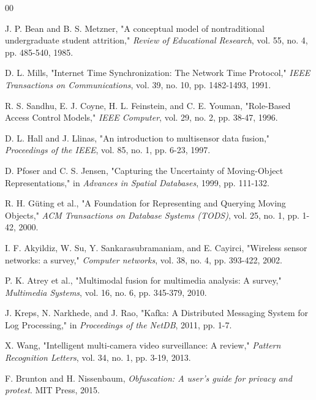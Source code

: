 \documentclass[conference]{IEEEtran}
\begin{document}
\begin{thebibliography}{00}

 J. P. Bean and B. S. Metzner, "A conceptual model of nontraditional undergraduate student attrition," \textit{Review of Educational Research}, vol. 55, no. 4, pp. 485-540, 1985.

 D. L. Mills, "Internet Time Synchronization: The Network Time Protocol," \textit{IEEE Transactions on Communications}, vol. 39, no. 10, pp. 1482-1493, 1991.

 R. S. Sandhu, E. J. Coyne, H. L. Feinstein, and C. E. Youman, "Role-Based Access Control Models," \textit{IEEE Computer}, vol. 29, no. 2, pp. 38-47, 1996.


 D. L. Hall and J. Llinas, "An introduction to multisensor data fusion," \textit{Proceedings of the IEEE}, vol. 85, no. 1, pp. 6-23, 1997.

 D. Pfoser and C. S. Jensen, "Capturing the Uncertainty of Moving-Object Representations," in \textit{Advances in Spatial Databases}, 1999, pp. 111-132.


 R. H. Güting et al., "A Foundation for Representing and Querying Moving Objects," \textit{ACM Transactions on Database Systems (TODS)}, vol. 25, no. 1, pp. 1-42, 2000.

 I. F. Akyildiz, W. Su, Y. Sankarasubramaniam, and E. Cayirci, "Wireless sensor networks: a survey," \textit{Computer networks}, vol. 38, no. 4, pp. 393-422, 2002.

 P. K. Atrey et al., "Multimodal fusion for multimedia analysis: A survey," \textit{Multimedia Systems}, vol. 16, no. 6, pp. 345-379, 2010.

 J. Kreps, N. Narkhede, and J. Rao, "Kafka: A Distributed Messaging System for Log Processing," in \textit{Proceedings of the NetDB}, 2011, pp. 1-7.


 X. Wang, "Intelligent multi-camera video surveillance: A review," \textit{Pattern Recognition Letters}, vol. 34, no. 1, pp. 3-19, 2013.

 F. Brunton and H. Nissenbaum, \textit{Obfuscation: A user's guide for privacy and protest}. MIT Press, 2015.


\end{thebibliography}
\end{document}
